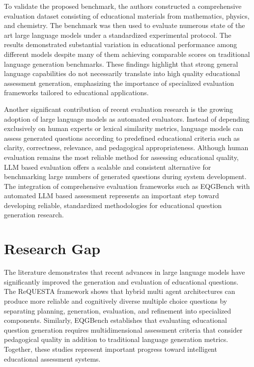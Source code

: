 To validate the proposed benchmark, the authors constructed a comprehensive evaluation dataset consisting of educational materials from mathematics, physics, and chemistry. The benchmark was then used to evaluate numerous state of the art large language models under a standardized experimental protocol. The results demonstrated substantial variation in educational performance among different models despite many of them achieving comparable scores on traditional language generation benchmarks. These findings highlight that strong general language capabilities do not necessarily translate into high quality educational assessment generation, emphasizing the importance of specialized evaluation frameworks tailored to educational applications. \cite{eqgbench2025}

Another significant contribution of recent evaluation research is the growing adoption of large language models as automated evaluators. Instead of depending exclusively on human experts or lexical similarity metrics, language models can assess generated questions according to predefined educational criteria such as clarity, correctness, relevance, and pedagogical appropriateness. Although human evaluation remains the most reliable method for assessing educational quality, LLM based evaluation offers a scalable and consistent alternative for benchmarking large numbers of generated questions during system development. The integration of comprehensive evaluation frameworks such as EQGBench with automated LLM based assessment represents an important step toward developing reliable, standardized methodologies for educational question generation research. \cite{eqgbench2025}
\section{Research Gap}
\label{sec:research-gap}

The literature demonstrates that recent advances in large language models have significantly improved the generation and evaluation of educational questions. The ReQUESTA framework shows that hybrid multi agent architectures can produce more reliable and cognitively diverse multiple choice questions by separating planning, generation, evaluation, and refinement into specialized components. Similarly, EQGBench establishes that evaluating educational question generation requires multidimensional assessment criteria that consider pedagogical quality in addition to traditional language generation metrics. Together, these studies represent important progress toward intelligent educational assessment systems.


